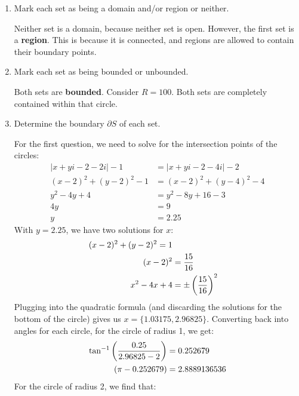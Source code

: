 \begin{enumerate}
\begin{enumerate}
\begin{problem}
			The first set is \textbf{connected}. Consider the straight line between any two points. It is contained within the set. \gline{}
			The second set is \textbf{not connected}. Consider the point $\{1\}$. There is no path from 1 to any other point in the set. 
		\end{problem}
		\item Mark each set as being a domain and/or region or neither.
		\begin{problem}
			Neither set is a domain, because neither set is open. However, the first set is a \textbf{region}. This is because it is connected, and regions are allowed to contain their boundary points. 
		\end{problem}
		\item Mark each set as being bounded or unbounded.
		\begin{problem}
			Both sets are \textbf{bounded}. Consider $R = 100$. Both sets are completely contained within that circle. 
		\end{problem}
		\item Determine the boundary $\partial S$ of each set. 
		\begin{problem}
			For the first question, we need to solve for the intersection points of the circles:
			\begin{align*}
				|x+yi-2-2i|-1 &= |x+yi - 2 - 4i| - 2\\
				(x - 2)^2 + (y-2)^2 - 1 &= (x-2)^2 + (y-4)^2 - 4\\
				y^2 -4y + 4&= y^2 - 8y + 16 - 3\\
				4y&= 9\\
				y&= 2.25
			\end{align*}
			With $y = 2.25$, we have two solutions for $x$:
			\begin{align*}
				(x-2)^2 + (y-2)^2 = 1\\
				(x-2)^2 &= \frac{15}{16}\\
				x^2 - 4x + 4&=\pm\left(\frac{15}{16}\right)^2
			\end{align*}
			Plugging into the quadratic formula (and discarding the solutions for the bottom of the circle) gives us $x = \{1.03175, 2.96825\}$. Converting back into angles for each circle, for the circle of radius 1, we get:
			\begin{align*}
				\tan^{-1}\left(\frac{0.25}{2.96825-2}\right)&=0.252679\\
				(\pi - 0.252679)&= 2.8889136536
			\end{align*}
			For the circle of radius 2, we find that:
			\begin{align*}

\end{align*}
\end{problem}
\end{enumerate}
\end{enumerate}
